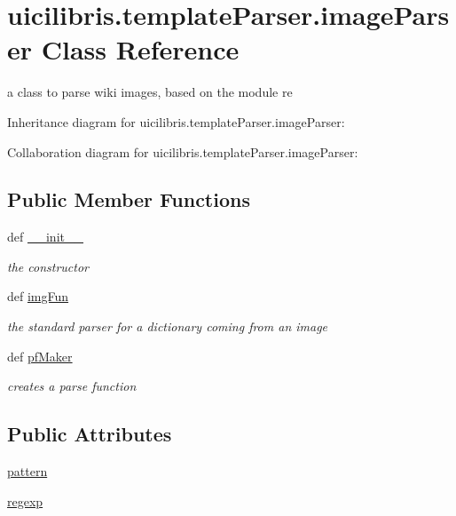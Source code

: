 \hypertarget{classuicilibris_1_1templateParser_1_1imageParser}{\section{uicilibris.\-template\-Parser.\-image\-Parser \-Class \-Reference}
\label{classuicilibris_1_1templateParser_1_1imageParser}
}


a class to parse wiki images, based on the module re  




\-Inheritance diagram for uicilibris.\-template\-Parser.\-image\-Parser\-:


\-Collaboration diagram for uicilibris.\-template\-Parser.\-image\-Parser\-:
\subsection*{\-Public \-Member \-Functions}
\begin{DoxyCompactItemize}
\item 
def \hyperlink{classuicilibris_1_1templateParser_1_1imageParser_a4cc5f3b8d724bfa80ee95471c5abef2f}{\-\_\-\-\_\-init\-\_\-\-\_\-}
\begin{DoxyCompactList}\small\item\em the constructor \end{DoxyCompactList}\item 
def \hyperlink{classuicilibris_1_1templateParser_1_1imageParser_a1537fa3c112db90c76428bb8d81ae876}{img\-Fun}
\begin{DoxyCompactList}\small\item\em the standard parser for a dictionary coming from an image \end{DoxyCompactList}\item 
def \hyperlink{classuicilibris_1_1templateParser_1_1imageParser_aea563d5172ebb0554783f636267b1e5f}{pf\-Maker}
\begin{DoxyCompactList}\small\item\em creates a parse function \end{DoxyCompactList}\end{DoxyCompactItemize}
\subsection*{\-Public \-Attributes}
\begin{DoxyCompactItemize}
\item 
\hyperlink{classuicilibris_1_1templateParser_1_1imageParser_acbade4bd60a213ae591dad90f64021a7}{pattern}
\item 
\hyperlink{classuicilibris_1_1templateParser_1_1imageParser_aaf8ed396434c4dc4b6edc3dcf1ffbbd2}{regexp}
\end{DoxyCompactItemize}


